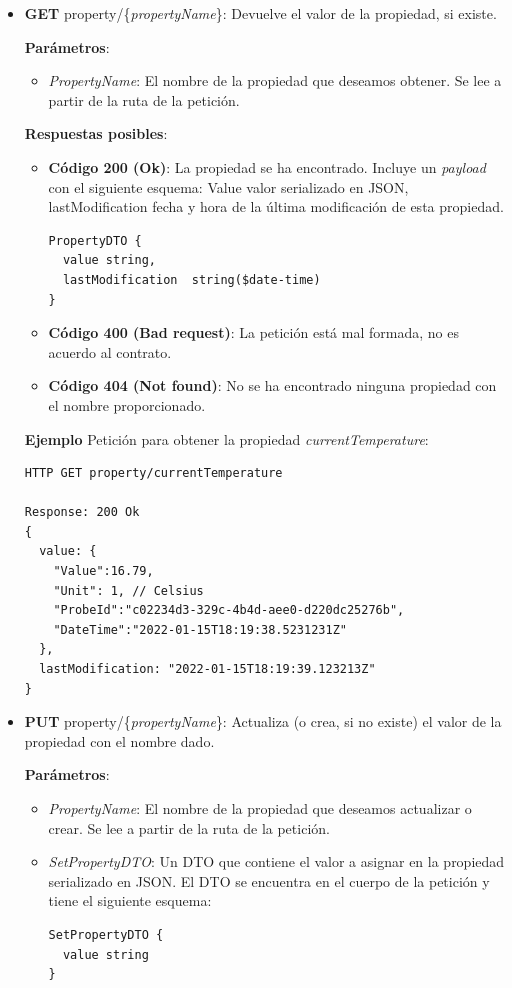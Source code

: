 \begin{itemize}
  \item \textbf{GET} property/\{\textit{propertyName}\}: Devuelve el valor de la propiedad, si existe.

  \textbf{Parámetros}:

  \begin{itemize}
    \item \textit{PropertyName}: El nombre de la propiedad que deseamos obtener. Se lee a partir de la ruta de la petición.
  \end{itemize}

  \textbf{Respuestas posibles}:

  \begin{itemize}
    \item \textbf{Código 200 (Ok)}: La propiedad se ha encontrado. Incluye un \textit{payload} con el siguiente esquema: Value valor serializado en JSON, lastModification fecha y hora de la última modificación de esta propiedad.

  \begin{verbatim}
PropertyDTO {
  value	string,
  lastModification	string($date-time)
}
      \end{verbatim}

    \item \textbf{Código 400 (Bad request)}: La petición está mal formada, no es acuerdo al contrato.

    \item \textbf{Código 404 (Not found)}: No se ha encontrado ninguna propiedad con el nombre proporcionado.
  \end{itemize}

  \textbf{Ejemplo} Petición para obtener la propiedad \textit{currentTemperature}:

  \begin{verbatim}
HTTP GET property/currentTemperature

Response: 200 Ok
{
  value: {
    "Value":16.79,
    "Unit": 1, // Celsius
    "ProbeId":"c02234d3-329c-4b4d-aee0-d220dc25276b",
    "DateTime":"2022-01-15T18:19:38.5231231Z"
  },
  lastModification: "2022-01-15T18:19:39.123213Z"
}
  \end{verbatim}

  \item \textbf{PUT} property/\{\textit{propertyName}\}: Actualiza (o crea, si no existe) el valor de la propiedad con el nombre dado.

  \textbf{Parámetros}:
  \begin{itemize}
    \item \textit{PropertyName}: El nombre de la propiedad que deseamos actualizar o crear. Se lee a partir de la ruta de la petición.
    \item \textit{SetPropertyDTO}: Un DTO que contiene el valor a asignar en la propiedad serializado en JSON. El DTO se encuentra en el cuerpo de la petición y tiene el siguiente esquema:
    \begin{verbatim}
SetPropertyDTO {
  value	string
}
    \end{verbatim}
  \end{itemize}


\end{itemize}
